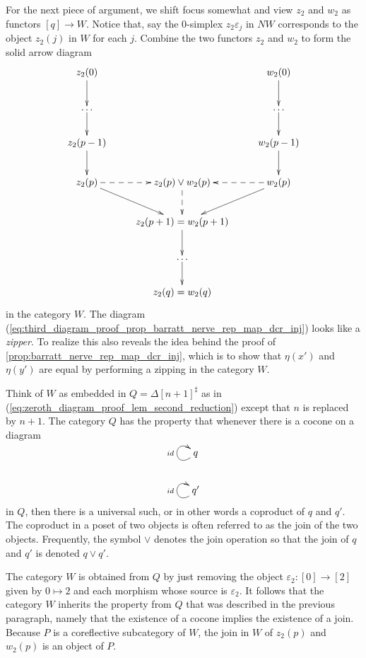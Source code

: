 For the next piece of argument, we shift focus somewhat and view $z_2$ and $w_2$ as functors $[q]\to W$. Notice that, say the $0$-simplex $z_2\varepsilon _j$ in $NW$ corresponds to the object $z_2(j)$ in $W$ for each $j$. Combine the two functors $z_2$ and $w_2$ to form the solid arrow diagram
\begin{equation}
\label{eq:third_diagram_proof_prop_barratt_nerve_rep_map_dcr_inj}
\begin{gathered}
\xymatrix{
z_2(0) \ar[d] && w_2(0) \ar[d] \\
\dots \ar[d] && \dots \ar[d] \\
z_2(p-1) \ar[d] && w_2(p-1) \ar[d] \\
z_2(p) \ar[dr] \ar@{-->}[r] & z_2(p)\vee w_2(p) \ar@{-->}[d] & w_2(p) \ar[ld] \ar@{-->}[l] \\
& z_2(p+1)=w_2(p+1) \ar[d] \\
& \dots \ar[d] \\
& z_2(q)=w_2(q)
}
\end{gathered}
\end{equation}
in the category $W$. The diagram (\ref{eq:third_diagram_proof_prop_barratt_nerve_rep_map_dcr_inj}) looks like a \emph{zipper}. To realize this also reveals the idea behind the proof of \cref{prop:barratt_nerve_rep_map_dcr_inj}, which is to show that $\eta (x')$ and $\eta (y')$ are equal by performing a zipping in the category $W$.

Think of $W$ as embedded in $Q=\Delta [n+1]^\sharp$ as in (\ref{eq:zeroth_diagram_proof_lem_second_reduction}) except that $n$ is replaced by $n+1$. The category $Q$ has the property that whenever there is a cocone on a diagram
\begin{displaymath}
\xymatrix{%
q \ar@(ld,lu)^{id} \\
q' \ar@(ld,lu)^{id}
}
\end{displaymath}
in $Q$, then there is a universal such, or in other words a coproduct of $q$ and $q'$. The coproduct in a poset of two objects is often referred to as the join of the two objects. Frequently, the symbol $\vee$ denotes the join operation so that the join of $q$ and $q'$ is denoted $q\vee q'$.

The category $W$ is obtained from $Q$ by just removing the object $\varepsilon _2:[0]\to [2]$ given by $0\mapsto 2$ and each morphism whose source is $\varepsilon _2$. It follows that the category $W$ inherits the property from $Q$ that was described in the previous paragraph, namely that the existence of a cocone implies the existence of a join. Because $P$ is a coreflective subcategory of $W$, the join in $W$ of $z_2(p)$ and $w_2(p)$ is an object of $P$.

